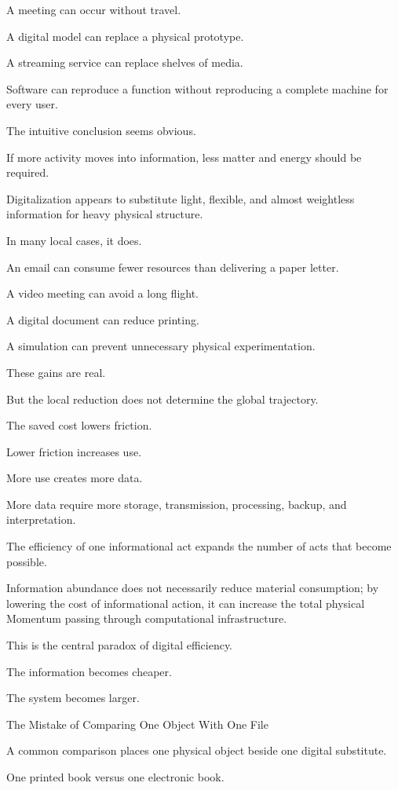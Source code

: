 A meeting can occur without travel.

A digital model can replace a physical prototype.

A streaming service can replace shelves of media.

Software can reproduce a function without reproducing a complete machine for every user.

The intuitive conclusion seems obvious.

If more activity moves into information, less matter and energy should be required.

Digitalization appears to substitute light, flexible, and almost weightless information for heavy physical structure.

In many local cases, it does.

An email can consume fewer resources than delivering a paper letter.

A video meeting can avoid a long flight.

A digital document can reduce printing.

A simulation can prevent unnecessary physical experimentation.

These gains are real.

But the local reduction does not determine the global trajectory.

The saved cost lowers friction.

Lower friction increases use.

More use creates more data.

More data require more storage, transmission, processing, backup, and interpretation.

The efficiency of one informational act expands the number of acts that become possible.

Information abundance does not necessarily reduce material consumption; by lowering the cost of informational action, it can increase the total physical Momentum passing through computational infrastructure.

This is the central paradox of digital efficiency.

The information becomes cheaper.

The system becomes larger.

The Mistake of Comparing One Object With One File

A common comparison places one physical object beside one digital substitute.

One printed book versus one electronic book.

